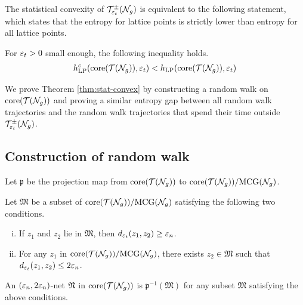 The statistical convexity of $\mathcal{T}_{\varepsilon_t}^{\pm}(\mathcal{N}_g)$ is equivalent to the following statement, which states that the entropy for \concave lattice points is strictly lower than entropy for all lattice points.

\begin{theorem}
  \label{thm:stat-convex}
  For $\varepsilon_t > 0$ small enough, the following inequality holds.
  \begin{align*}
    h_{\mathrm{LP}}^c(\mathrm{core}(\mathcal{T}(\mathcal{N}_g)), \varepsilon_t) < h_{\mathrm{LP}}(\mathrm{core}(\mathcal{T}(\mathcal{N}_g)), \varepsilon_t)
  \end{align*}
\end{theorem}

We prove Theorem \ref{thm:stat-convex} by constructing a random walk on $\mathrm{core}(\mathcal{T}(\mathcal{N}_g))$ and proving a similar entropy gap between all random walk trajectories and the random walk trajectories that spend their time outside $\mathcal{T}_{\varepsilon_t}^{\pm}(\mathcal{N}_g)$.

\subsection{Construction of random walk}
\label{sec:constr-rand-walk}

Let $\mathfrak{p}$ be the projection map from $\mathrm{core}(\mathcal{T}(\mathcal{N}_g))$ to $\mathrm{core}(\mathcal{T}(\mathcal{N}_g)) / \mathrm{MCG}(\mathcal{N}_g)$.

\begin{definition}
  Let $\mathfrak{M}$ be a subset of $\mathrm{core}(\mathcal{T}(\mathcal{N}_g)) / \mathrm{MCG}(\mathcal{N}_g)$ satisfying the following two conditions.
  \begin{enumerate}[(i)]
  \item If $z_1$ and $z_2$ lie in $\mathfrak{M}$, then $d_{\varepsilon_t}(z_1, z_2) \geq \varepsilon_n$.
  \item For any $z_1$ in $\mathrm{core}(\mathcal{T}(\mathcal{N}_g)) / \mathrm{MCG}(\mathcal{N}_g)$, there exists $z_2 \in \mathfrak{M}$ such that $d_{\varepsilon_t}(z_1, z_2) \leq 2 \varepsilon_n$.
  \end{enumerate}
  An $(\varepsilon_n, 2\varepsilon_n)$-net $\mathfrak{N}$ in $\mathrm{core}(\mathcal{T}(\mathcal{N}_g))$ is $\mathfrak{p}^{-1}(\mathfrak{M})$ for any subset $\mathfrak{M}$ satisfying the above conditions.
\end{definition}

